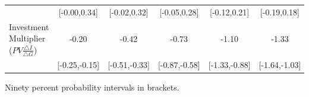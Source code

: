 \documentclass[letterpaper,12pt]{article}%
\begin{document}
\begin{table}[H]
\begin{threeparttable}
\begin{tabular}{l c c c c c}
			\quad &   [-0.00,0.34] & [-0.02,0.32] & [-0.05,0.28] & [-0.12,0.21] & [-0.19,0.18] \\
			\quad Investment Multiplier ($PV \frac{ \triangle I}{\triangle G}$)&  -0.20 & -0.42 & -0.73 & -1.10 & -1.33 \\
			\quad &   [-0.25,-0.15] & [-0.51,-0.33] & [-0.87,-0.58] & [-1.33,-0.88] & [-1.64,-1.03] \\
			\bottomrule    
		\end{tabular}
	\begin{tablenotes}
		\item Ninety percent probability intervals in brackets.
	\end{tablenotes}
		\label{tab:RWMH_M}
	\end{threeparttable}
\end{table}
\end{document}
